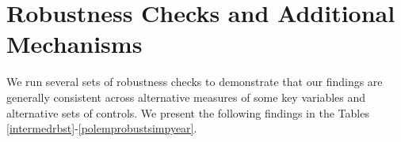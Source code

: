 {\renewcommand\normalsize{\tiny}%
	\normalsize
}

{\renewcommand\normalsize{\tiny}%
	\normalsize
}

{\renewcommand\normalsize{\tiny}%
	\normalsize
}

\begin{landscape}
{\renewcommand\normalsize{\tiny}%
	\normalsize
}
\end{landscape}


{\renewcommand\normalsize{\tiny}%
	\normalsize
}

{\renewcommand\normalsize{\tiny}%
	\normalsize
}

{\renewcommand\normalsize{\tiny}%
	\normalsize
}



\section{Robustness Checks and Additional Mechanisms}
\vspace*{.2in}
\setlength{\parskip}{-2em}
\doublespacing
\setcounter{table}{0}
\setcounter{figure}{0}
\renewcommand{\thetable}{C\arabic{table}}	
\renewcommand{\thefigure}{C\arabic{figure}}	

We run several sets of robustness checks to demonstrate that our findings are generally consistent across alternative measures of some key variables and alternative sets of controls. We present the following findings in the Tables \ref{intermedrbst}-\ref{polemprobustsimpyear}. \\

